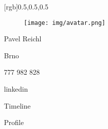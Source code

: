 \documentclass{article}
\begin{document}
\begin{paracol}{2}
[rgb]{0.5,0.5,0.5}

\begin{figure}[h!]
  \texttt{[image: img/avatar.png]}
\end{figure}

Pavel Reichl

Brno

777 982 828

linkedin


Timeline

\switchcolumn

Profile

\lipsum[1]

\end{paracol}
\end{document}

